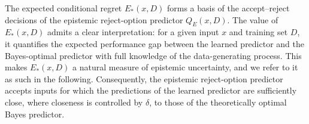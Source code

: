 The expected conditional regret $E_*(x, D)$ forms a basis of the accept–reject decisions of the epistemic reject-option predictor $Q_E(x, D)$. The value of $E_*(x, D)$ admits a clear interpretation: for a given input $x$ and training set $D$, it quantifies the expected performance gap between the learned predictor and the Bayes-optimal predictor with full knowledge of the data-generating process. This makes $E_*(x, D)$ a natural measure of epistemic uncertainty, and we refer to it as such in the following. Consequently, the epistemic reject-option predictor accepts inputs for which the predictions of the learned predictor are sufficiently close, where closeness is controlled by $\delta$, to those of the theoretically optimal Bayes predictor.